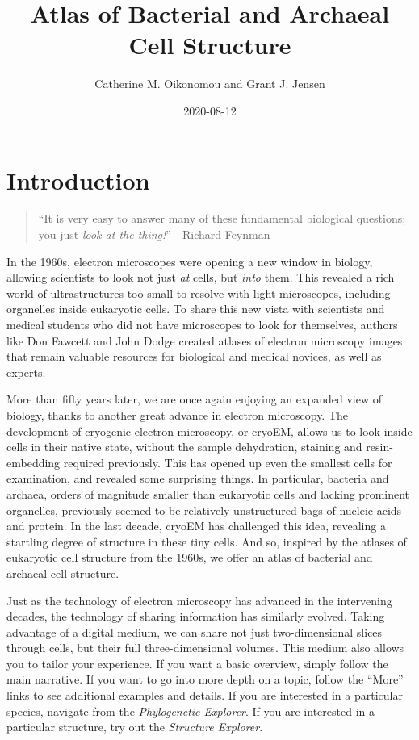 \documentclass[]{tufte-book}
\title{Atlas of Bacterial and Archaeal Cell Structure}
\author{Catherine M. Oikonomou and Grant J. Jensen}
\date{2020-08-12}
\begin{document}
\maketitle



{
\setcounter{tocdepth}{1}
\tableofcontents
}

\hypertarget{introduction}{%
\chapter*{Introduction}\label{introduction}}

\begin{quote}
``It is very easy to answer many of these fundamental biological questions; you just \emph{look at the thing!}''
- Richard Feynman \citep{feynman1960}
\end{quote}

In the 1960s, electron microscopes were opening a new window in biology, allowing scientists to look not just \emph{at} cells, but \emph{into} them. This revealed a rich world of ultrastructures too small to resolve with light microscopes, including organelles inside eukaryotic cells. To share this new vista with scientists and medical students who did not have microscopes to look for themselves, authors like Don Fawcett \citep{fawcett1966} and John Dodge \citep{dodge1968} created atlases of electron microscopy images that remain valuable resources for biological and medical novices, as well as experts.

More than fifty years later, we are once again enjoying an expanded view of biology, thanks to another great advance in electron microscopy. The development of cryogenic electron microscopy, or cryoEM, allows us to look inside cells in their native state, without the sample dehydration, staining and resin-embedding required previously. This has opened up even the smallest cells for examination, and revealed some surprising things. In particular, bacteria and archaea, orders of magnitude smaller than eukaryotic cells and lacking prominent organelles, previously seemed to be relatively unstructured bags of nucleic acids and protein. In the last decade, cryoEM has challenged this idea, revealing a startling degree of structure in these tiny cells. And so, inspired by the atlases of eukaryotic cell structure from the 1960s, we offer an atlas of bacterial and archaeal cell structure.

Just as the technology of electron microscopy has advanced in the intervening decades, the technology of sharing information has similarly evolved. Taking advantage of a digital medium, we can share not just two-dimensional slices through cells, but their full three-dimensional volumes. This medium also allows you to tailor your experience. If you want a basic overview, simply follow the main narrative. If you want to go into more depth on a topic, follow the ``More'' links to see additional examples and details. If you are interested in a particular species, navigate from the \emph{Phylogenetic Explorer}. If you are interested in a particular structure, try out the \emph{Structure Explorer}.
\end{document}
